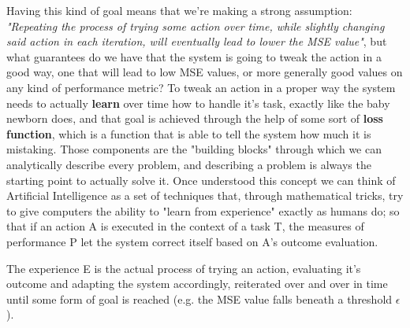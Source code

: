 \documentclass[11pt,a4paper,titlepage]{book}
\begin{document}
Having this kind of goal means that we're making a strong assumption: \textit{"Repeating the process of trying some action over time, while slightly changing said action in each iteration, will eventually lead to lower the MSE value"}, but what guarantees do we have that the system is going to tweak the action in a good way, one that will lead to low MSE values, or more generally good values on any kind of performance metric?
\newline
\newline
To tweak an action in a proper way the system needs to actually \textbf{learn} over time how to handle it's task, exactly like the baby newborn does, and that goal is achieved through the help of some sort of \textbf{loss function}, which is a function that is able to tell the system how much it is mistaking. 
Those components are the "building blocks" through which we can analytically describe every problem, and describing a problem is always the starting point to actually solve it.
\newline
\newline
Once understood this concept we can think of Artificial Intelligence as a set of techniques that, through mathematical tricks, try to give computers the ability to "learn from experience" exactly as humans do; so that if an action A is executed in the context of a task T, the measures of performance P let the system correct itself based on A's outcome evaluation.

The experience E is the actual process of trying an action, evaluating it's outcome and adapting the system accordingly, reiterated over and over in time until some form of goal is reached (e.g. the MSE value falls beneath a threshold $\epsilon$).
\end{document}
